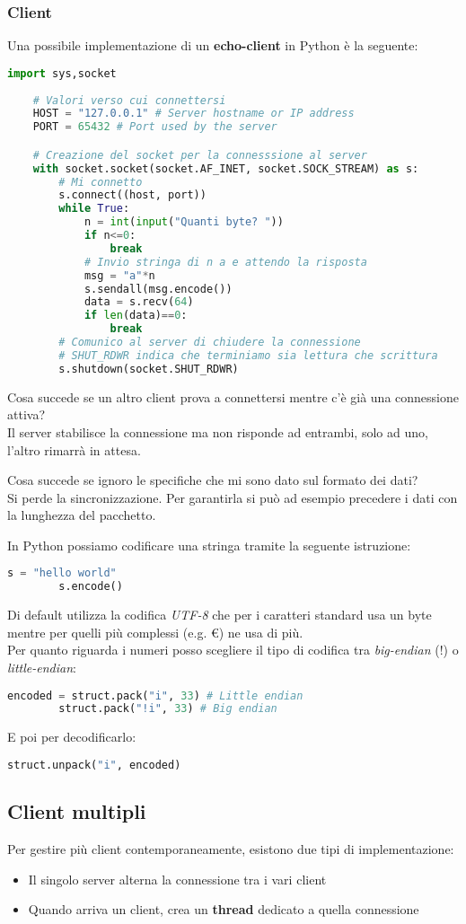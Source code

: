 \subsubsection{Client}
Una possibile implementazione di un \textbf{echo-client} in Python è la seguente:
\begin{lstlisting}[language=Python]
	import sys,socket
	
	# Valori verso cui connettersi 
	HOST = "127.0.0.1" # Server hostname or IP address
	PORT = 65432 # Port used by the server

	# Creazione del socket per la connesssione al server
	with socket.socket(socket.AF_INET, socket.SOCK_STREAM) as s:
		# Mi connetto
		s.connect((host, port))
		while True:
			n = int(input("Quanti byte? "))
			if n<=0:
				break
			# Invio stringa di n a e attendo la risposta   
			msg = "a"*n
			s.sendall(msg.encode())
			data = s.recv(64)
			if len(data)==0:
				break
		# Comunico al server di chiudere la connessione
		# SHUT_RDWR indica che terminiamo sia lettura che scrittura     
		s.shutdown(socket.SHUT_RDWR)
\end{lstlisting}

\begin{observation}
	Cosa succede se un altro client prova a connettersi mentre c'è già una connessione attiva?\\
	Il server stabilisce la connessione ma non risponde ad entrambi, solo ad uno, l'altro rimarrà in attesa.
\end{observation}
\begin{observation}
	Cosa succede se ignoro le specifiche che mi sono dato sul formato dei dati?\\
	Si perde la sincronizzazione. Per garantirla si può ad esempio precedere i dati con la lunghezza del pacchetto.
\end{observation}
\begin{observation}[Codifica]
	In Python possiamo codificare una stringa tramite la seguente istruzione:
	\begin{lstlisting}[language=Python]
		s = "hello world"
		s.encode()
	\end{lstlisting}
	Di default utilizza la codifica \textit{UTF-8} che per i caratteri standard usa un byte mentre per quelli più complessi (e.g. €) ne usa di più. \\
	Per quanto riguarda i numeri posso scegliere il tipo di codifica tra \textit{big-endian} (!) o \textit{little-endian}:
	\begin{lstlisting}[language=Python]
		encoded = struct.pack("i", 33) # Little endian
		struct.pack("!i", 33) # Big endian
	\end{lstlisting}
	E poi per decodificarlo:
	\begin{lstlisting}[language=Python]
		struct.unpack("i", encoded)
	\end{lstlisting}
\end{observation}
\subsection{Client multipli}
Per gestire più client contemporaneamente, esistono due tipi di implementazione:
\begin{itemize}
	\item Il singolo server alterna la connessione tra i vari client
	\item Quando arriva un client, crea un \textbf{thread} dedicato a quella connessione
\end{itemize}
